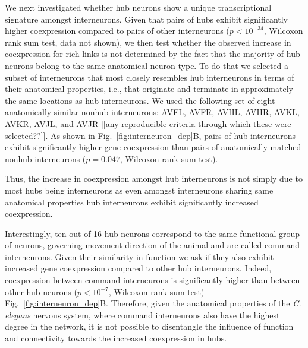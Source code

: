 \documentclass[10pt,letterpaper]{article}
\begin{document}
We next investigated whether hub neurons show a unique transcriptional signature amongst interneurons.
Given that pairs of hubs exhibit significantly higher coexpression compared to pairs of other interneurons ($p < 10^{-34}$, Wilcoxon rank sum test, data not shown), we then test whether the observed increase in coexpression for rich links is not determined by the fact that the majority of hub neurons belong to the same anatomical neuron type. 
To do that we selected a subset of interneurons that most closely resembles hub interneurons in terms of their anatomical properties, i.e., that originate and terminate in approximately the same locations as hub interneurons.
We used the following set of eight anatomically similar nonhub interneurons: AVFL, AVFR, AVHL, AVHR, AVKL, AVKR, AVJL, and AVJR [[any reproducible criteria through which these were selected??]].
As shown in Fig.~\ref{fig:interneuron_dep}B, pairs of hub interneurons exhibit significantly higher gene coexpression than pairs of anatomically-matched nonhub interneurons ($p = 0.047$, Wilcoxon rank sum test).

Thus, the increase in coexpression amongst hub interneurons is not simply due to most hubs being interneurons as even amongst interneurons sharing same anatomical properties hub interneurons exhibit significantly increased coexpression.

Interestingly, ten out of 16 hub neurons correspond to the same functional group of neurons, governing movement direction of the animal and are called command interneurons. 
Given their similarity in function we ask if they also exhibit increased gene coexpression compared to other hub interneurons.
Indeed, coexpression between command interneurons is significantly higher than between other hub neurons ($p<10^{-7}$, Wilcoxon rank sum test) Fig.~\ref{fig:interneuron_dep}B. 
Therefore, given the anatomical properties of the \textit{C. elegans} nervous system, where command interneurons also have the highest degree in the network, it is not possible to disentangle the influence of function and connectivity towards the increased coexpression in hubs. 
\end{document}
